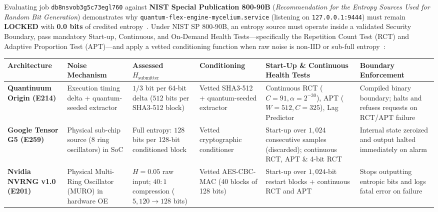 \documentclass[10pt,letterpaper]{article}
\begin{document}
Evaluating job \texttt{db8nsvob3g5c73egl760} against \textbf{NIST Special Publication 800-90B} (\emph{Recommendation for the Entropy Sources Used for Random Bit Generation}) demonstrates why \texttt{quantum-flex-engine-mycelium.service} (listening on \texttt{127.0.0.1:9444}) must remain \textbf{LOCKED} with \textbf{0.0 bits} of credited entropy~\cite{qfx_doc,nist_e259}. Under NIST SP 800-90B, an entropy source must operate inside a validated Security Boundary, pass mandatory Start-up, Continuous, and On-Demand Health Tests---specifically the Repetition Count Test (RCT) and Adaptive Proportion Test (APT)---and apply a vetted conditioning function when raw noise is non-IID or sub-full entropy~\cite{nist_e259,nist_e214,nist_e120,nist_e201,nist_e279,nist_e166}:

\vspace{6pt}\noindent\begin{minipage}{\textwidth}
\centering
{}
\vspace{2pt}
\scriptsize
\begin{tabularx}{\textwidth}{L{2.3cm} L{2.5cm} L{2.5cm} L{2.4cm} Y L{2.5cm}}
\toprule
\textbf{Architecture} & \textbf{Noise Mechanism} & \textbf{Assessed $H_{\text{submitter}}$} & \textbf{Conditioning} & \textbf{Start-Up \& Continuous Health Tests} & \textbf{Boundary Enforcement} \\
\midrule
\textbf{Quantinuum Origin (E214)}~\cite{nist_e214} & Execution timing delta + quantum-seeded extractor & $1/3$ bit per 64-bit delta ($512$ bits per SHA3-512 block) & Vetted SHA3-512 + quantum-seeded extractor & Continuous RCT ($C=91, \alpha=2^{-30}$), APT ($W=512, C=325$), Lag Predictor & Compiled binary boundary; halts and refuses requests on RCT/APT failure \\
\textbf{Google Tensor G5 (E259)}~\cite{nist_e259} & Physical sub-chip source (8 ring oscillators) in SoC & Full entropy: $128$ bits per 128-bit conditioned block & Vetted cryptographic conditioner & Start-up over $1{,}024$ consecutive samples (discarded); continuous RCT, APT \& 4-bit RCT & Internal state zeroized and output halted immediately on alarm \\
\textbf{Nvidia NVRNG v1.0 (E201)}~\cite{nist_e201} & Physical Multi-Ring Oscillator (MURO) in hardware OE & $H = 0.05$ raw input; $40:1$ compression ($5{,}120 \to 128$ bits) & Vetted AES-CBC-MAC (40 blocks of 128 bits) & Start-up over $1{,}024$-bit restart blocks + continuous RCT and APT & Stops outputting entropic bits and logs fatal error on failure \\

\end{tabularx}
\end{minipage}
\end{document}
